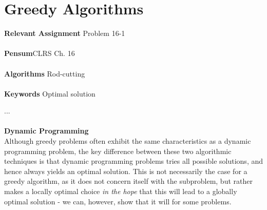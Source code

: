 
\chapter{Greedy Algorithms}
\label{ch:greedyalgorithms}

\textbf{Relevant Assignment} Problem 16-1 \\\\
\textbf{Pensum}CLRS Ch. 16\\\\
\textbf{Algorithms} Rod-cutting \\\\
\textbf{Keywords} Optimal solution
\vspace{1in}

\noindent ...
\\\\
\noindent \textbf{Dynamic Programming} \\
Although greedy problems often exhibit the same characteristics as a dynamic
programming problem, the key difference between these two algorithmic
techniques is that dynamic programming problems tries all possible solutions,
and hence always yields an optimal solution. This is not necessarily the case
for a greedy algorithm, as it does not concern itself with the subproblem, but
rather makes a locally optimal choice \textit{in the hope} that this will lead
to a globally optimal solution - we can, however, show that it will for some
problems.

